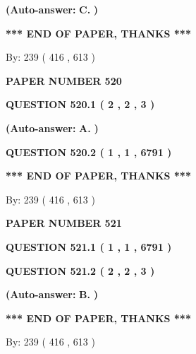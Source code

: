 \documentclass[12pt]{article}
\begin{document}
 
{\textbf{(Auto-answer:}}
{\textbf{\large{
C.}}}
{\textbf{)}}
 
 
   
   
   
   
\vspace{1.0in} 
{\textbf{\large{ *** END OF PAPER, THANKS *** }}} 
   
   
\hspace{1.0in} By: 
 239 ( 416 ,  613 )
   
   
   
   
\newpage 
\setcounter{page}{ 
   520001 } 
   
   
 {\textbf{ \Large{ PAPER NUMBER  520  }}}
   
   
   
   
  
  
{\textbf{\large{QUESTION
520.1 
 ( 2 , 2 , 3 )
}}}
 
 
{\textbf{(Auto-answer:}}
{\textbf{\large{
A.}}}
{\textbf{)}}
 
 
  
  
{\textbf{\large{QUESTION
520.2 
 ( 1 , 1 , 6791 )
}}}
   
   
   
   
\vspace{1.0in} 
{\textbf{\large{ *** END OF PAPER, THANKS *** }}} 
   
   
\hspace{1.0in} By: 
 239 ( 416 ,  613 )
   
   
   
   
\newpage 
\setcounter{page}{ 
   521001 } 
   
   
 {\textbf{ \Large{ PAPER NUMBER  521  }}}
   
   
   
   
  
  
{\textbf{\large{QUESTION
521.1 
 ( 1 , 1 , 6791 )
}}}
  
  
{\textbf{\large{QUESTION
521.2 
 ( 2 , 2 , 3 )
}}}
 
 
{\textbf{(Auto-answer:}}
{\textbf{\large{
B.}}}
{\textbf{)}}
 
 
   
   
   
   
\vspace{1.0in} 
{\textbf{\large{ *** END OF PAPER, THANKS *** }}} 
   
   
\hspace{1.0in} By: 
 239 ( 416 ,  613 )
   
   
   
   
\newpage 
\setcounter{page}{ 
   522001 } 
   
\end{document}
